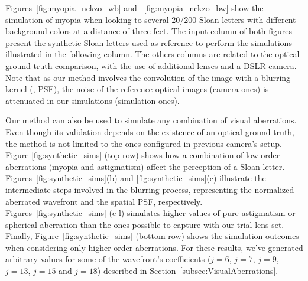 

Figures~\ref{fig:myopia_nckzo_wb} and ~\ref{fig:myopia_nckzo_bw} show the simulation of myopia when looking to several 20/200 Sloan letters with different background colors at a distance of three feet. The input column of both figures present the synthetic Sloan letters used as reference to perform the simulations illustrated in the following column. The others columns are related to the optical ground truth comparison, with the use of additional lenses and a DSLR camera. Note that as our method involves the convolution of the image with a blurring kernel (\ie, PSF), the noise of the reference optical images (camera ones) is attenuated in our simulations (simulation ones).



Our method can also be used to simulate any combination of visual aberrations. Even though its validation depends on the existence of an optical ground truth, the method is not limited to the ones configured in previous camera's setup. Figure \ref{fig:synthetic_sims} (top row) shows how a combination of low-order aberrations (myopia and astigmatism) affect the perception of a Sloan letter. Figures~\ref{fig:synthetic_sims}(b) and \ref{fig:synthetic_sims}(c) illustrate the intermediate steps involved in the blurring process, representing the normalized aberrated wavefront and the spatial PSF, respectively. Figures~\ref{fig:synthetic_sims} (e-l) simulates higher values of pure astigmatism or spherical aberration than the ones possible to capture with our trial lens set. Finally, Figure~\ref{fig:synthetic_sims} (bottom row) shows the simulation outcomes when considering only higher-order aberrations. For these results, we've generated arbitrary values for some of the wavefront's coefficients ($j=6$, $j=7$, $j=9$, $j=13$, $j=15$ and $j=18$) described in Section~\ref{subsec:VisualAberrations}.


%


